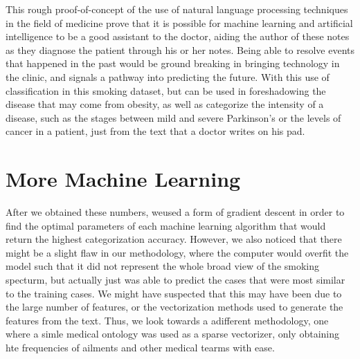 \documentclass[12pt]{article}
\begin{document}
This rough proof-of-concept of the use of natural language processing techniques in the field of medicine prove that it is possible for machine learning and artificial intelligence to be a good assistant to the doctor, aiding the author of these notes as they diagnose the patient through his or her notes. Being able to resolve events that happened in the past would be ground breaking in bringing technology in the clinic, and signals a pathway into predicting the future. With this use of classification in this smoking dataset, but can be used in foreshadowing the disease that may come from obesity, as well as categorize the intensity of a disease, such as the stages between mild and severe Parkinson's or the levels of cancer in a patient, just from the text that a doctor writes on his pad.



\section{More Machine Learning}
After we obtained these numbers, weused a form of gradient descent in order to find the optimal parameters of each machine learning algorithm that would return the highest categorization accuracy. However, we also noticed that there might be a slight flaw in our methodology, where the computer would overfit the model such that it did not represent the whole broad view of the smoking specturm, but actually just was able to predict the cases that were most similar to the training cases. We might have suspected that this may have been due to the large number of features, or the vectorization methods used to generate the features from the text. Thus, we look towards a adifferent methodology, one where a simle medical ontology was used as a sparse vectorizer, only obtaining hte frequencies of ailments and other medical tearms with ease.
\end{document}
